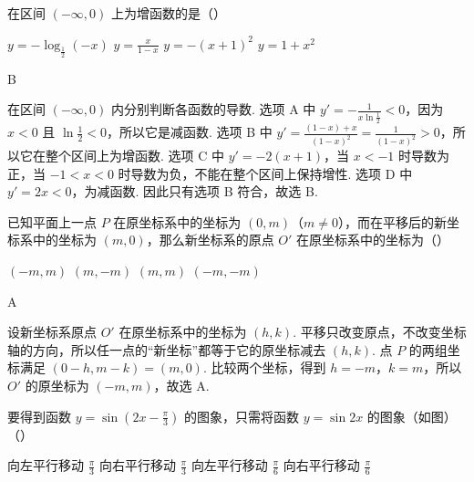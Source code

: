 \documentclass[UTF8,a4paper,oneside,11pt]{ctexbook}
\begin{document}
\begin{problem}
在区间 \((-\infty,0)\) 上为增函数的是（\quad）

\choices
    {\(y = -\log_{\frac{1}{2}}(-x)\)}
    {\(y = \frac{x}{1 - x}\)}
    {\(y = -(x + 1)^2\)}
    {\(y = 1 + x^2\)}
\end{problem}

\begin{answer}
B
\end{answer}

\begin{solution}
在区间 \((-\infty,0)\) 内分别判断各函数的导数. 选项 A 中 \(y'=-\frac{1}{x\ln\frac12}<0\)，因为 \(x<0\) 且 \(\ln\frac12<0\)，所以它是减函数. 选项 B 中 \(y'=\frac{(1-x)+x}{(1-x)^2}=\frac{1}{(1-x)^2}>0\)，所以它在整个区间上为增函数. 选项 C 中 \(y'=-2(x+1)\)，当 \(x<-1\) 时导数为正，当 \(-1<x<0\) 时导数为负，不能在整个区间上保持增性. 选项 D 中 \(y'=2x<0\)，为减函数. 因此只有选项 B 符合，故选 B.
\end{solution}

\begin{problem}
已知平面上一点 \(P\) 在原坐标系中的坐标为 \((0,m)\)（\(m \neq 0\)），而在平移后的新坐标系中的坐标为 \((m,0)\)，那么新坐标系的原点 \(O'\) 在原坐标系中的坐标为（\quad）

\choices
    {\((-m,m)\)}
    {\((m,-m)\)}
    {\((m,m)\)}
    {\((-m,-m)\)}
\end{problem}

\begin{answer}
A
\end{answer}

\begin{solution}
设新坐标系原点 \(O'\) 在原坐标系中的坐标为 \((h,k)\). 平移只改变原点，不改变坐标轴的方向，所以任一点的“新坐标”都等于它的原坐标减去 \((h,k)\). 点 \(P\) 的两组坐标满足 \((0-h,m-k)=(m,0)\). 比较两个坐标，得到 \(h=-m\)，\(k=m\)，所以 \(O'\) 的原坐标为 \((-m,m)\)，故选 A.
\end{solution}

\begin{problem}
要得到函数 \(y = \sin \left(2x - \frac{\pi}{3}\right)\) 的图象，只需将函数 \(y = \sin 2x\) 的图象（如图）（\quad）


\choices
    {向左平行移动 \(\frac{\pi}{3}\)}
    {向右平行移动 \(\frac{\pi}{3}\)}
    {向左平行移动 \(\frac{\pi}{6}\)}
    {向右平行移动 \(\frac{\pi}{6}\)}
\end{problem}
\end{document}
